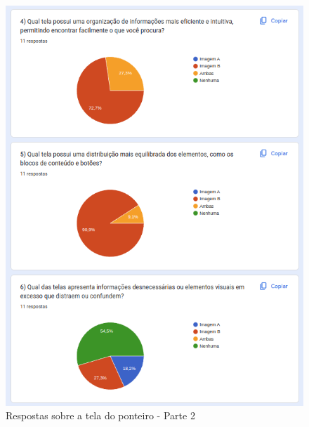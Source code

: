 \begin{figure}[!h]
	\begin{center}
	    \includegraphics[scale=0.7]{figs/Answers/Professionals/18.png}
	\end{center}
	\caption{\label{APC_TPon02}Respostas sobre a tela do ponteiro - Parte 2}
\end{figure}

\newpage


